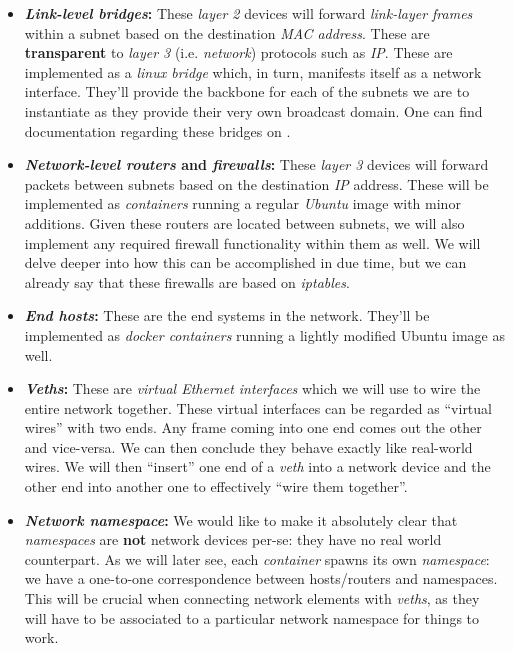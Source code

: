             \begin{itemize}
                \item \textbf{\textit{Link-level bridges}:} These \textit{layer 2} devices will forward \textit{link-layer frames} within a subnet based on the destination \textit{MAC address}. These are \textbf{transparent} to \textit{layer 3} (i.e. \textit{network}) protocols such as \textit{IP}. These are implemented as a \textit{linux bridge} which, in turn, manifests itself as a network interface. They'll provide the backbone for each of the subnets we are to instantiate as they provide their very own broadcast domain. One can find documentation regarding these bridges on \cite{bib:kernel-brds}.

                \item \textbf{\textit{Network-level routers} and \textit{firewalls}:} These \textit{layer 3} devices will forward packets between subnets based on the destination \textit{IP} address. These will be implemented as \textit{containers} running a regular \textit{Ubuntu} image with minor additions. Given these routers are located between subnets, we will also implement any required firewall functionality within them as well. We will delve deeper into how this can be accomplished in due time, but we can already say that these firewalls are based on \textit{iptables}.

                \item \textbf{\textit{End hosts}:} These are the end systems in the network. They'll be implemented as \textit{docker containers} running a lightly modified Ubuntu image as well.

                \item \textbf{\textit{Veths}:} These are \textit{virtual Ethernet interfaces} which we will use to wire the entire network together. These virtual interfaces can be regarded as ``virtual wires'' with two ends. Any frame coming into one end comes out the other and vice-versa. We can then conclude they behave exactly like real-world wires. We will then ``insert'' one end of a \textit{veth} into a network device and the other end into another one to effectively ``wire them together''.

                \item \textbf{\textit{Network namespace}:} We would like to make it absolutely clear that \textit{namespaces} are \textbf{not} network devices per-se: they have no real world counterpart. As we will later see, each \textit{container} spawns its own \textit{namespace}: we have a one-to-one correspondence between hosts/routers and namespaces. This will be crucial when connecting network elements with \textit{veths}, as they will have to be associated to a particular network namespace for things to work.
            \end{itemize}

